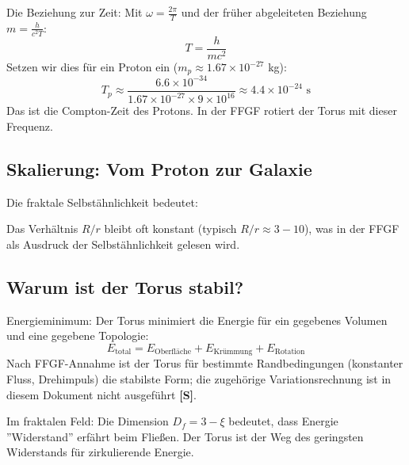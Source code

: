 	Die Beziehung zur Zeit:
	Mit \( \omega = \frac{2\pi}{T} \) und der früher abgeleiteten Beziehung \( m = \frac{h}{c^2 T} \):
	\[
	T = \frac{h}{mc^2}
	\]
	Setzen wir dies für ein Proton ein (\( m_p \approx 1.67 \times 10^{-27} \) kg):
	\[
	T_p \approx \frac{6.6 \times 10^{-34}}{1.67 \times 10^{-27} \times 9 \times 10^{16}} \approx 4.4 \times 10^{-24} \text{ s}
	\]
	Das ist die Compton-Zeit des Protons. In der FFGF rotiert der Torus mit dieser Frequenz.
	
	\subsection{Skalierung: Vom Proton zur Galaxie}
	Die fraktale Selbstähnlichkeit bedeutet:
	\begin{table}[H]
		\centering
	\end{table}
	Das Verhältnis \( R/r \) bleibt oft konstant (typisch \( R/r \approx 3-10 \)), was in der FFGF als Ausdruck der Selbstähnlichkeit gelesen wird.
	
	\subsection{Warum ist der Torus stabil?}
	Energieminimum:
	Der Torus minimiert die Energie für ein gegebenes Volumen und eine gegebene Topologie:
	\[
	E_{\text{total}} = E_{\text{Oberfläche}} + E_{\text{Krümmung}} + E_{\text{Rotation}}
	\]
	Nach FFGF-Annahme ist der Torus für bestimmte Randbedingungen (konstanter Fluss, Drehimpuls) die stabilste Form; die zugehörige Variationsrechnung ist in diesem Dokument nicht ausgeführt \textbf{[S]}.
	
	Im fraktalen Feld:
	Die Dimension \( D_f = 3 - \xi \) bedeutet, dass Energie ''Widerstand'' erfährt beim Fließen. Der Torus ist der Weg des geringsten Widerstands für zirkulierende Energie.
	
